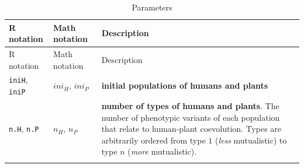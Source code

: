 \documentclass[]{book}
\begin{document}
\begin{longtable}[]{@{}lll@{}}
\caption{Parameters}\tabularnewline
\toprule
\begin{minipage}[b]{0.27\columnwidth}\raggedright
R notation\strut
\end{minipage} & \begin{minipage}[b]{0.25\columnwidth}\raggedright
Math notation\strut
\end{minipage} & \begin{minipage}[b]{0.40\columnwidth}\raggedright
Description\strut
\end{minipage}\tabularnewline
\midrule
\endfirsthead
\toprule
\begin{minipage}[b]{0.27\columnwidth}\raggedright
R notation\strut
\end{minipage} & \begin{minipage}[b]{0.25\columnwidth}\raggedright
Math notation\strut
\end{minipage} & \begin{minipage}[b]{0.40\columnwidth}\raggedright
Description\strut
\end{minipage}\tabularnewline
\midrule
\endhead
\begin{minipage}[t]{0.27\columnwidth}\raggedright
\texttt{iniH}, \texttt{iniP}\strut
\end{minipage} & \begin{minipage}[t]{0.25\columnwidth}\raggedright
\(ini_{H},\,ini_{P}\)\strut
\end{minipage} & \begin{minipage}[t]{0.40\columnwidth}\raggedright
\textbf{initial populations of humans and plants}\strut
\end{minipage}\tabularnewline
\begin{minipage}[t]{0.27\columnwidth}\raggedright
\texttt{n.H}, \texttt{n.P}\strut
\end{minipage} & \begin{minipage}[t]{0.25\columnwidth}\raggedright
\(n_{H},\,n_{P}\)\strut
\end{minipage} & \begin{minipage}[t]{0.40\columnwidth}\raggedright
\textbf{number of types of humans and plants}. The number of phenotypic variants of each population that relate to human-plant coevolution. Types are arbitrarily ordered from type \(1\) (\emph{less} mutualistic) to type \(n\) (\emph{more} mutualistic).\strut
\end{minipage}\tabularnewline
\begin{minipage}[t]{0.27\columnwidth}\raggedright

\end{minipage}
\end{longtable}
\end{document}

